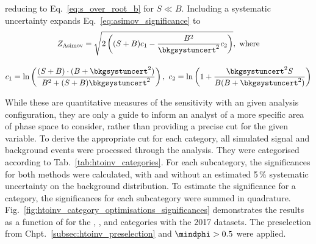 reducing to Eq.~\ref{eq:s_over_root_b} for $S \ll B$. Including a systematic uncertainty expands Eq.~\ref{eq:asimov_significance} to
\begin{equation}
    \begin{gathered}  %
Z_{\mathrm{Asimov}} = \sqrt{2 \left( (S + B) c_1 - \frac{B^2}{\bkgsystuncert^2}c_2 \right)}, \ \text{where} \\[1em]
c_1 = \ln\left( \frac{(S + B) \cdot (B + \bkgsystuncert^2)}{B^2 + (S + B)\bkgsystuncert^2} \right), \ c_2 = \ln\left( 1 + \frac{\bkgsystuncert^2 S}{B(B + \bkgsystuncert^2)} \right)
    \end{gathered}
\label{eq:asimov_significance_systs}
\end{equation}

While these are quantitative measures of the sensitivity with an given analysis configuration, they are only a guide to inform an analyst of a more specific area of phase space to consider, rather than providing a precise cut for the given variable. To derive the appropriate cut for each category, all simulated signal and background events were processed through the analysis. They were categorised according to Tab.~\ref{tab:htoinv_categories}. For each subcategory, the significances for both methods were calculated, with and without an estimated 5\,\% systematic uncertainty on the background distribution. To estimate the significance for a category, the significances for each subcategory were summed in quadrature. Fig.~\ref{fig:htoinv_category_optimisations_significances} demonstrates the results as a function of \omegaTilde for the \ttH, \VH, and \ggH categories with the 2017 datasets. The preselection from Chpt.~\ref{subsec:htoinv_preselection} and $\mindphi > \text{0.5}$ were applied.

